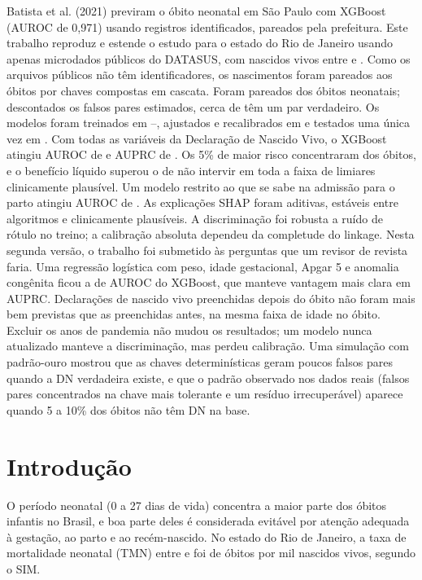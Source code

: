 \documentclass[12pt]{article}
\begin{document}
\begin{resumo}
Batista et al. (2021) previram o óbito neonatal em São Paulo com XGBoost (AUROC de 0,971) usando registros identificados, pareados pela prefeitura. Este trabalho reproduz e estende o estudo para o estado do Rio de Janeiro usando apenas microdados públicos do DATASUS, com \nNV{} nascidos vivos entre \anoIni{} e \anoFim. Como os arquivos públicos não têm identificadores, os nascimentos foram pareados aos óbitos por chaves compostas em cascata. Foram pareados \pctPareado{} dos \nObitosSIM{} óbitos neonatais; descontados os falsos pares estimados, cerca de \pctVerdadeiros{} têm um par verdadeiro. Os modelos foram treinados em \anoIni--\anoAjFim, ajustados e recalibrados em \anoValid{} e testados uma única vez em \anoTeste{}. Com todas as variáveis da Declaração de Nascido Vivo, o XGBoost atingiu AUROC de \AXgbAurocIC{} e AUPRC de \AXgbAuprc{}. Os 5\% de maior risco concentraram \AXgbTop{} dos óbitos, e o benefício líquido superou o de não intervir em toda a faixa de limiares clinicamente plausível. Um modelo restrito ao que se sabe na admissão para o parto atingiu AUROC de \BXgbAuroc{}. As explicações SHAP foram aditivas, estáveis entre algoritmos e clinicamente plausíveis. A discriminação foi robusta a ruído de rótulo no treino; a calibração absoluta dependeu da completude do linkage. Nesta segunda versão, o trabalho foi submetido às perguntas que um revisor de revista faria. Uma regressão logística com peso, idade gestacional, Apgar 5 e anomalia congênita ficou a \vBaseQuatroDauroc{} de AUROC do XGBoost, que manteve vantagem mais clara em AUPRC. Declarações de nascido vivo preenchidas depois do óbito não foram mais bem previstas que as preenchidas antes, na mesma faixa de idade no óbito. Excluir os anos de pandemia não mudou os resultados; um modelo nunca atualizado manteve a discriminação, mas perdeu calibração. Uma simulação com padrão-ouro mostrou que as chaves determinísticas geram poucos falsos pares quando a DN verdadeira existe, e que o padrão observado nos dados reais (falsos pares concentrados na chave mais tolerante e um resíduo irrecuperável) aparece quando 5 a 10\% dos óbitos não têm DN na base.
\end{resumo}

\section{Introdução}

O período neonatal (0 a 27 dias de vida) concentra a maior parte dos óbitos infantis no Brasil, e boa parte deles é considerada evitável por atenção adequada à gestação, ao parto e ao recém-nascido. No estado do Rio de Janeiro, a taxa de mortalidade neonatal (TMN) entre \anoIni{} e \anoFim foi de \tmnSIM{} óbitos por mil nascidos vivos, segundo o SIM.
\end{document}
